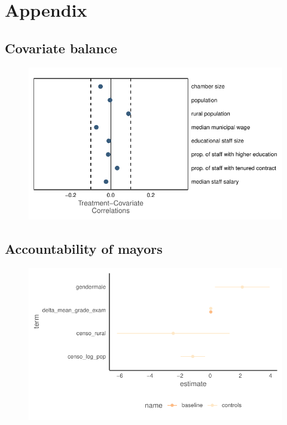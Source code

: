\pagebreak 



\pagebreak

\section*{Appendix}

\subsection{Covariate balance}

\begin{figure}[h]
    \centering
    \includegraphics{chapters/chapter_1/plots/covariate_balance.pdf}
\end{figure}

\pagebreak

\subsection{Accountability of mayors}
\label{app:accountability}

\begin{figure}[h]
    \centering
    \includegraphics{chapters/chapter_1/plots/accountability_fit.pdf}
\end{figure}

